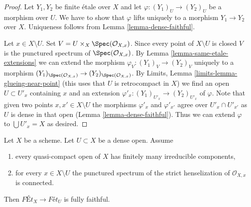 \begin{proof}
Let $Y_1, Y_2$ be finite \'etale over $X$ and let
$\varphi : (Y_1)_U \to (Y_2)_U$ be a morphism over $U$. We have to show that
$\varphi$ lifts uniquely to a morphism $Y_1 \to Y_2$ over $X$.
Uniqueness follows from Lemma \ref{lemma-dense-faithful}.

\medskip\noindent
Let $x \in X \setminus U$. Set $V = U \times_X \Spec(\mathcal{O}_{X, x})$.
Since every point of $X \setminus U$ is closed $V$ is the punctured spectrum
of $\Spec(\mathcal{O}_{X, x})$. By
Lemma \ref{lemma-same-etale-extensions}
we can extend the morphism $\varphi_V : (Y_1)_V \to (Y_2)_V$
uniquely to a morphism
$(Y_1)_{\Spec(\mathcal{O}_{X, x})} \to (Y_2)_{\Spec(\mathcal{O}_{X, x})}$.
By Limits, Lemma \ref{limits-lemma-glueing-near-point}
(this uses that $U$ is retrocompact in $X$)
we find an open $U \subset U'_x$ containing $x$ and an extension
$\varphi'_x : (Y_1)_{U'_x} \to (Y_2)_{U'_x}$ of $\varphi$.
Note that given two points $x, x' \in X \setminus U$ the
morphisms $\varphi'_x$ and $\varphi'_{x'}$ agree over
$U'_x \cap U'_{x'}$ as $U$ is dense in that open
(Lemma \ref{lemma-dense-faithful}). Thus we can extend $\varphi$
to $\bigcup U'_x = X$ as desired.
\end{proof}

\begin{lemma}
\label{lemma-quasi-compact-dense-open-connected-at-infinity}
Let $X$ be a scheme. Let $U \subset X$ be a dense open. Assume
\begin{enumerate}
\item every quasi-compact open of $X$ has finitely many
irreducible components,
\item for every $x \in X \setminus U$ the punctured spectrum of the
strict henselization of $\mathcal{O}_{X, x}$ is connected.
\end{enumerate}
Then $\textit{F\'Et}_X \to \textit{F\'et}_U$ is fully faithful.
\end{lemma}

